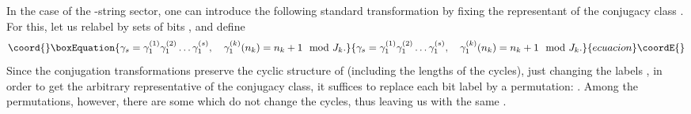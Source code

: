 \documentclass[a4paper]{article}
\begin{document}
In the case of the \coordHE{}-string sector, one can introduce the
following standard \coordHE{} transformation by fixing the
representant of the conjugacy class \myHighlight{$[\gamma_1]$}\coordHE{}. For this, let us
relabel \coordHE{} by sets of bits \coordHE{}  \coordHE{}, \coordHE{} and define
\begin{equation}\coord{}\boxEquation{\label{multi-s}
  \gamma_s=\gamma_1^{(1)}\gamma_1^{(2)}\dots\gamma_1^{(s)},\quad
  \gamma_1^{(k)}(n_k)=n_k+1 \mod J_k.
}{\gamma_s=\gamma_1^{(1)}\gamma_1^{(2)}\dots\gamma_1^{(s)},\quad
  \gamma_1^{(k)}(n_k)=n_k+1 \mod J_k.
}{ecuacion}\coordE{}\end{equation}
Since the conjugation transformations preserve the cyclic
structure of \coordHE{} (including the lengths of the cycles), just
changing the labels \cite{Scott:GT}, in order to get the arbitrary
representative \coordHE{} of the conjugacy class, it suffices to
replace each bit label by a permutation: \coordHE{}.
Among the permutations, however, there are some which do not
change the cycles, thus leaving us with the same \coordHE{}.
\end{document}
